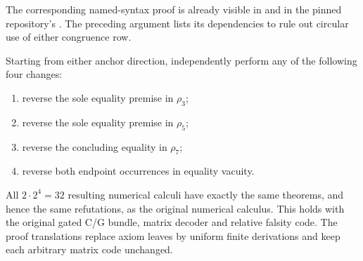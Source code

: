 The corresponding named-syntax proof is already visible in
 and 
in the pinned repository's .
The preceding argument lists its dependencies to rule out
circular use of either congruence row.

\begin{theorem}
Starting from either anchor direction, independently perform
any of the following four changes:
\begin{enumerate}
\item reverse the sole equality premise in $\rho_3$;
\item reverse the sole equality premise in $\rho_5$;
\item reverse the concluding equality in $\rho_7$;
\item reverse both endpoint occurrences in equality vacuity.
\end{enumerate}
All $2\cdot2^4=32$ resulting numerical calculi have exactly
the same theorems, and hence the same refutations, as the
original numerical calculus.  This holds with the original
gated C/G bundle, matrix decoder and relative falsity code.
The proof translations replace axiom leaves by uniform finite
derivations and keep each arbitrary matrix code unchanged.
\end{theorem}

